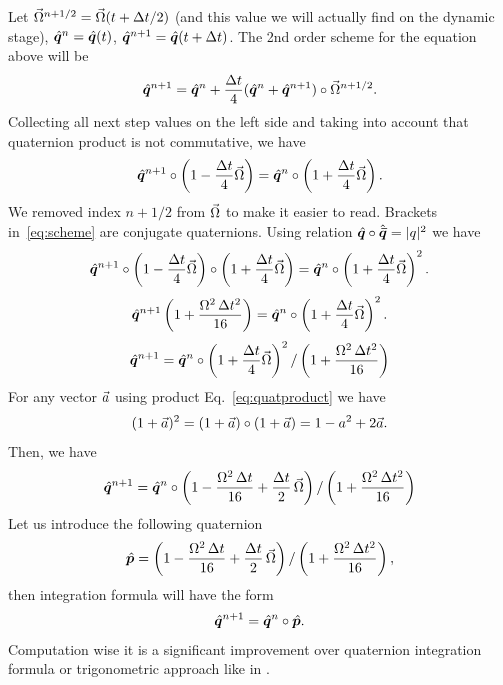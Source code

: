 Let ${\vec{\Omega}}^{n+1/2} = {\vec{\Omega}}(t+\Delta t/2)$ (and this
value we will actually find on the dynamic stage),
${\hat{\bm{q}}}^{n}={\hat{\bm{q}}}(t)$,
${\hat{\bm{q}}}^{n+1}={\hat{\bm{q}}}(t+\Delta t)$. The 2nd order scheme for
the equation above will be
\begin{equation}
  {\hat{\bm{q}}}^{n+1} = {\hat{\bm{q}}}^n + \frac{\Delta t}{4} 
  ({\hat{\bm{q}}}^{n}+{\hat{\bm{q}}}^{n+1})\circ
  {\vec{\Omega}}^{n+1/2}.
\end{equation}
Collecting all next step values on the left side and taking into
account that quaternion product is not commutative, we have
\begin{equation}\label{eq:scheme}
  {\hat{\bm{q}}}^{n+1}\circ\left( 1 - \frac{\Delta t}{4}{\vec{\Omega}}\right) = 
  {\hat{\bm{q}}}^{n}\circ\left( 1 + \frac{\Delta t}{4}{\vec{\Omega}}\right).
\end{equation}
We removed index $n+1/2$ from ${\vec{\Omega}}$ to make it easier to
read. Brackets in~\eqref{eq:scheme} are conjugate
quaternions. Using relation ${\hat{\bm{q}}}\circ{\hat{\bm{\bar{q}}}} = |q|^2$ we have
\begin{equation}
  {\hat{\bm{q}}}^{n+1}\circ\left( 1 - \frac{\Delta
    t}{4}{\vec{\Omega}}\right)\circ\left( 1 + \frac{\Delta
    t}{4}{\vec{\Omega}}\right) = {\hat{\bm{q}}}^{n}\circ\left( 1 + \frac{\Delta
    t}{4}{\vec{\Omega}}\right)^2.
\end{equation}
\begin{equation}
  {\hat{\bm{q}}}^{n+1}\left( 1 +\frac{ \Omega^2\,\Delta
    t^2}{16}\right) = {\hat{\bm{q}}}^{n}\circ\left( 1 + \frac{\Delta
    t}{4}{\vec{\Omega}}\right)^2.
\end{equation}
\begin{equation}
  {\hat{\bm{q}}}^{n+1} = {\hat{\bm{q}}}^{n}\circ\left( 1 + \frac{\Delta
    t}{4}{\vec{\Omega}}\right)^2 / \left( 1 +\frac{ \Omega^2\,\Delta
    t^2}{16}\right)
\end{equation}
For any vector ${\vec{a}}$ using product Eq.~\eqref{eq:quatproduct} we
have
\begin{equation}
  (1+{\vec{a}})^2 = (1+{\vec{a}})\circ(1+{\vec{a}}) =
  1 - a^2 + 2{\vec{a}}.
\end{equation}
Then, we have
\begin{equation}
  {\hat{\bm{q}}}^{n+1} = {\hat{\bm{q}}}^{n} \circ \left(1 - \frac{\Omega^2\,\Delta t}{16} +
  \frac{\Delta t}{2}\,{\vec{\Omega}} \right) / \left( 1 +\frac{ \Omega^2\,\Delta
    t^2}{16}\right)
\end{equation}
Let us introduce the following quaternion
\begin{equation}
  {\hat{\bm{p}}} = \left(1 - \frac{\Omega^2\,\Delta t}{16} + \frac{\Delta
    t}{2}\,{\vec{\Omega}} \right) / \left( 1 +\frac{ \Omega^2\,\Delta
    t^2}{16}\right),
\end{equation}
then integration formula will have the form
\begin{equation}
  {\hat{\bm{q}}}^{n+1} = {\hat{\bm{q}}}^{n} \circ {\hat{\bm{p}}}.
\end{equation}
Computation wise it is a significant improvement over
\cite{bib:Walton-Braun-1993} quaternion integration formula or
trigonometric approach like in \cite{bib:gpugems3-harada-2008}.

